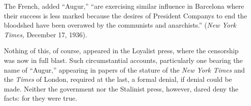 \indexNYT
The French, added ``Augur,'' ``are exercising similar influence in Barcelona where their success is less marked because the desires of President Companys to end the bloodshed have been overawed by the communists and anarchists.'' (\emph{New York Times,} December 17, 1936).

Nothing of this, of course, appeared in the Loyalist press, where the censorship was now in full blast. Such circumstantial accounts, particularly one bearing the name of ``Augur,'' appearing in papers of the stature of the \emph{New York Times} and the \emph{Times} of London, required at the last, a formal denial, if denial could be made. Neither the government nor the Stalinist press, however, dared deny the facts: for they were true.




